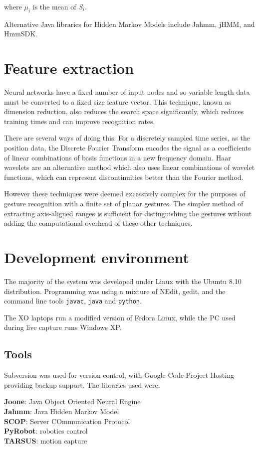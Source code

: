 \documentclass[12pt,a4,notitlepage]{report}
\renewcommand{\_}{\texttt{\symbol{95}}}
\newcommand{\<}{\texttt{\symbol{60}}}
\renewcommand{\>}{\texttt{\symbol{62}}}
\begin{document}
where $\mu_i$ is the mean of $S_i$.

Alternative Java libraries for Hidden Markov Models include Jahmm, jHMM, and HmmSDK.

\section{Feature extraction}

Neural networks have a fixed number of input nodes and so variable length data must be converted to a fixed size feature vector. This technique, known as dimension reduction, also reduces the search space significantly, which reduces training times and can improve recognition rates.\cite{NeuralPat}

There are several ways of doing this. For a discretely sampled time series, as the position data, the Discrete Fourier Transform encodes the signal as a coefficients of linear combinations of basis functions in a new frequency domain. Haar wavelets are an alternative method which also uses linear combinations of wavelet functions, which can represent discontinuities better than the Fourier method.

However these techniques were deemed excessively complex for the purposes of gesture recognition with a finite set of planar gestures. The simpler method of extracting axis-aligned ranges is sufficient for distinguishing the gestures without adding the computational overhead of these other techniques.

\section{Development environment}

The majority of the system was developed under Linux with the Ubuntu 8.10 distribution. Programming was using a mixture of NEdit, gedit, and the command line tools \texttt{javac}, \texttt{java} and \texttt{python}.

The XO laptops run a modified version of Fedora Linux, while the PC used during live capture runs Windows XP.

\subsection{Tools}

Subversion was used for version control, with Google Code Project Hosting providing backup support. The libraries used were:

\textbf{Joone}: Java Object Oriented Neural Engine \cite{Joone}\\
\textbf{Jahmm}: Java Hidden Markov Model \cite{Jahmm} \\
\textbf{SCOP}: Server COmmunication Protocol \cite{SCOP} \\
\textbf{PyRobot}: robotics control \\
\textbf{TARSUS}: motion capture
\end{document}

